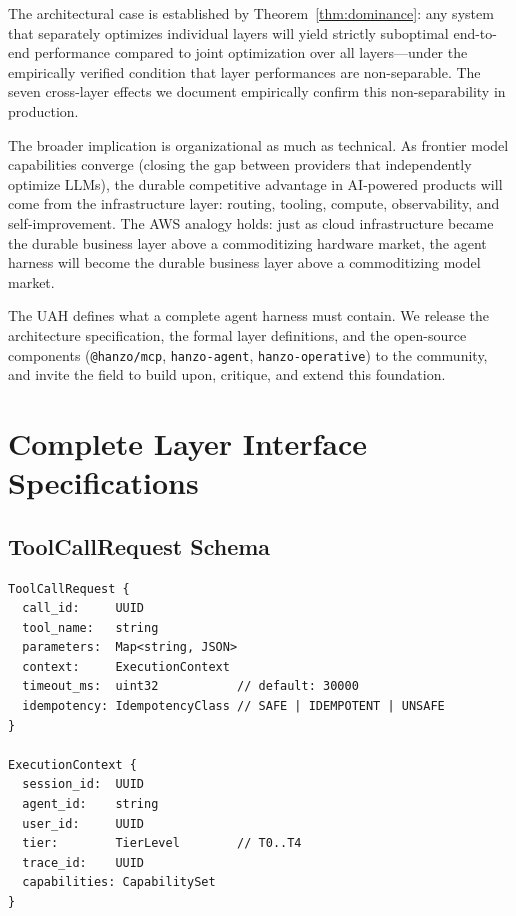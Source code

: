 \documentclass[11pt]{article}
\begin{document}
The architectural case is established by Theorem~\ref{thm:dominance}: any
system that separately optimizes individual layers will yield strictly
suboptimal end-to-end performance compared to joint optimization over all
layers---under the empirically verified condition that layer performances
are non-separable. The seven cross-layer effects we document empirically
confirm this non-separability in production.

The broader implication is organizational as much as technical. As frontier
model capabilities converge (closing the gap between providers that
independently optimize LLMs), the durable competitive advantage in
AI-powered products will come from the infrastructure layer: routing,
tooling, compute, observability, and self-improvement. The AWS analogy
holds: just as cloud infrastructure became the durable business layer above
a commoditizing hardware market, the agent harness will become the durable
business layer above a commoditizing model market.

The UAH defines what a complete agent harness must contain. We release the
architecture specification, the formal layer definitions, and the
open-source components (\texttt{@hanzo/mcp}, \texttt{hanzo-agent},
\texttt{hanzo-operative}) to the community, and invite the field to build
upon, critique, and extend this foundation.

\appendix

\section{Complete Layer Interface Specifications}
\label{app:interfaces}

\subsection{ToolCallRequest Schema}

\begin{verbatim}
ToolCallRequest {
  call_id:     UUID
  tool_name:   string
  parameters:  Map<string, JSON>
  context:     ExecutionContext
  timeout_ms:  uint32           // default: 30000
  idempotency: IdempotencyClass // SAFE | IDEMPOTENT | UNSAFE
}

ExecutionContext {
  session_id:  UUID
  agent_id:    string
  user_id:     UUID
  tier:        TierLevel        // T0..T4
  trace_id:    UUID
  capabilities: CapabilitySet
}
\end{verbatim}
\end{document}
